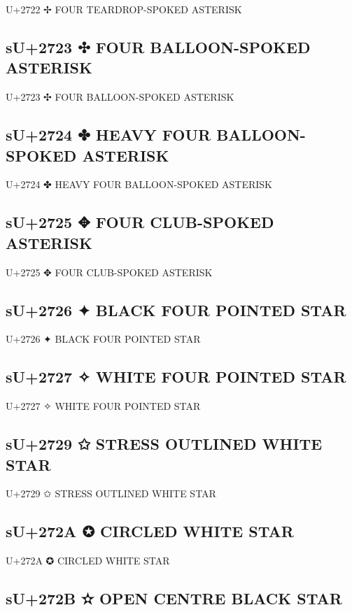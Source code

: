 U+2722 ✢ FOUR TEARDROP-SPOKED ASTERISK

\subsection{sU+2723 ✣ FOUR BALLOON-SPOKED ASTERISK}

U+2723 ✣ FOUR BALLOON-SPOKED ASTERISK

\subsection{sU+2724 ✤ HEAVY FOUR BALLOON-SPOKED ASTERISK}

U+2724 ✤ HEAVY FOUR BALLOON-SPOKED ASTERISK

\subsection{sU+2725 ✥ FOUR CLUB-SPOKED ASTERISK}

U+2725 ✥ FOUR CLUB-SPOKED ASTERISK

\subsection{sU+2726 ✦ BLACK FOUR POINTED STAR}

U+2726 ✦ BLACK FOUR POINTED STAR

\subsection{sU+2727 ✧ WHITE FOUR POINTED STAR}

U+2727 ✧ WHITE FOUR POINTED STAR

\subsection{sU+2729 ✩ STRESS OUTLINED WHITE STAR}

U+2729 ✩ STRESS OUTLINED WHITE STAR

\subsection{sU+272A ✪ CIRCLED WHITE STAR}

U+272A ✪ CIRCLED WHITE STAR

\subsection{sU+272B ✫ OPEN CENTRE BLACK STAR}

